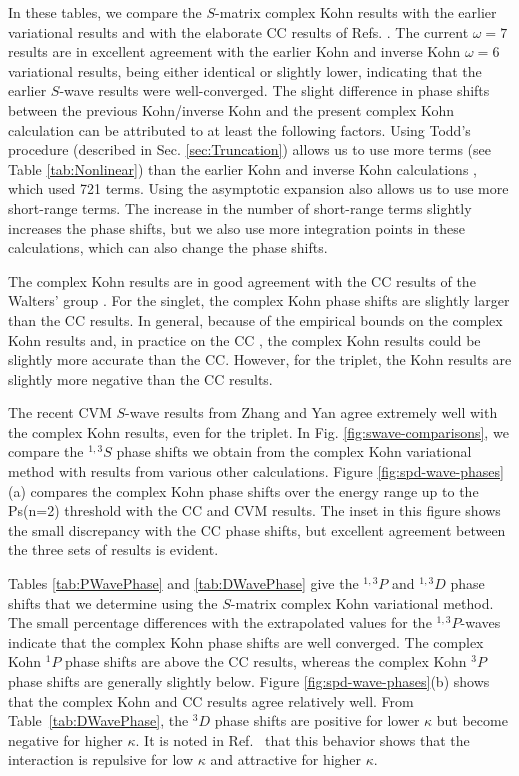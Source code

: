 \documentclass[preprint,showpacs,showkeys,preprintnumbers,amsmath,amssymb,longbibliography,pra,aps]{revtex4-1}
\begin{document}
In these tables, we compare the $S$-matrix complex Kohn results with
the earlier variational 
results \cite{VanReeth2003,VanReeth2004} and with the elaborate CC results of 
Refs. \cite{Blackwood2002,Walters2004}. The current $\omega = 7$ results are 
in excellent agreement with the earlier Kohn and inverse Kohn $\omega = 6$ variational 
results, being either identical or slightly lower, indicating that the 
earlier $S$-wave results were well-converged. The slight difference in 
phase shifts between the previous Kohn/inverse Kohn and the
present complex Kohn calculation can be attributed 
to at least the following factors. Using Todd's procedure (described in Sec. \ref{sec:Truncation}) 
allows us to use more terms (see Table \ref{tab:Nonlinear}) than the earlier 
Kohn and inverse Kohn calculations \cite{VanReeth2003,VanReeth2004}, which used 721 terms. Using
the asymptotic expansion also allows us to use more short-range terms.
The increase in the number of short-range terms
slightly increases the phase shifts, but we also use more integration 
points in these calculations, which can also change the phase shifts. 

The complex Kohn results are in good agreement with the CC results of the 
Walters' group \cite{Blackwood2002,Walters2004}. For the singlet, the complex 
Kohn phase shifts are slightly larger than the CC results.
In general, because of the 
empirical bounds on the complex Kohn results and,
in practice on the CC \cite{Blackwood2002}, the complex Kohn results could be slightly 
more accurate than the CC. However, for the triplet,
the Kohn results are slightly more negative than the CC results.

The recent CVM $S$-wave results from Zhang and Yan \cite{Zhang2012} agree 
extremely well with the complex Kohn results, even for the triplet. In Fig.
\ref{fig:swave-comparisons},
we compare the $^{1,3}S$ phase shifts we obtain from 
the complex Kohn variational method with results from various other calculations. Figure 
\ref{fig:spd-wave-phases}(a) compares the complex Kohn phase shifts over the 
energy range up to the Ps(n=2) threshold with the CC and CVM results. The 
inset in this figure shows the small discrepancy with the CC phase shifts, 
but excellent agreement between the three sets of results is evident. 

Tables \ref{tab:PWavePhase} and \ref{tab:DWavePhase} give the $^{1,3}P$ and
$^{1,3}D$
phase shifts that we determine using the $S$-matrix complex Kohn variational 
method. The small percentage differences with the extrapolated values for the 
$^{1,3}P$-waves indicate that the complex Kohn phase shifts are well converged.
The complex Kohn $^1P$ phase shifts are above the CC
results, whereas the complex Kohn $^3P$ phase shifts are generally slightly below.
Figure \ref{fig:spd-wave-phases}(b) shows that the 
complex Kohn and CC results agree relatively well.
From Table~\ref{tab:DWavePhase}, the $^3D$ phase shifts are positive for
lower $\kappa$ but become negative for higher $\kappa$. 
It is noted in Ref.~\cite{Blackwood2002} that this behavior shows that the
interaction is repulsive for low $\kappa$ and attractive for higher $\kappa$.
\end{document}
